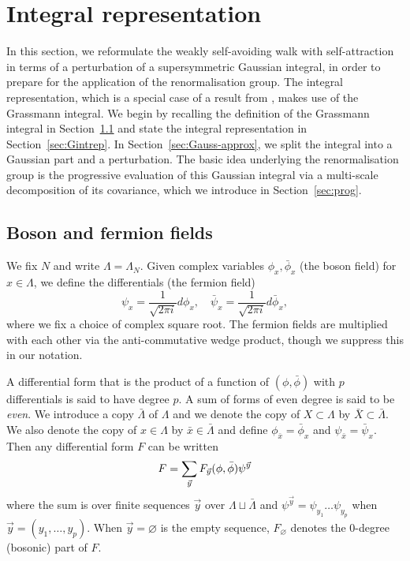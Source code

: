 \section{Integral representation}
In this section, we reformulate the %
weakly self-avoiding walk with self-attraction in terms of a perturbation of a supersymmetric
Gaussian integral, in order to prepare for the application of the renormalisation group.
The integral representation, which is a special case of a result from \cite{BIS09},
makes use of the Grassmann integral. We begin by recalling the definition of the Grassmann
integral in Section~\ref{sec:forms} and state the integral representation in Section~\ref{sec:Gintrep}.
In Section~\ref{sec:Gauss-approx}, we split the integral into a Gaussian part and a perturbation.
The basic idea underlying the renormalisation group is the progressive evaluation of this
Gaussian integral via a multi-scale decomposition of its covariance, which we introduce in Section~\ref{sec:prog}.


\subsection{Boson and fermion fields}
\label{sec:forms}

We fix $N$ and write $\Lambda = \Lambda_N$.
Given complex variables $\phi_x, \bar\phi_x$
(the boson field) for $x \in \Lambda$,
we define the differentials (the fermion field)
\begin{equation}
\psi_x = \frac{1}{\sqrt{2\pi i}} d\phi_x,
\quad
\bar\psi_x = \frac{1}{\sqrt{2\pi i}} d\bar\phi_x,
\end{equation}
where we fix a choice of complex square root.
The fermion fields are multiplied with each other
via the anti-commutative wedge product,
though we suppress this in our notation.

A differential form that is the
product of a function of $(\phi, \bar\phi)$
with $p$ differentials is said to have degree $p$.
A sum of forms of even degree is said to be \emph{even}.
We introduce a copy $\bar\Lambda$ of $\Lambda$
and we denote the copy of $X \subset \Lambda$ by $\bar X \subset \bar\Lambda$.
We also denote the copy of $x \in \Lambda$
by $\bar x \in \bar\Lambda$ and define $\phi_{\bar x} = \bar\phi_x$ and $\psi_{\bar x} = \bar\psi_x$.
Then any differential form $F$ can be written
\begin{equation}
\lbeq{FinNcal}
F
=
\sum_{\vec y}
F_{\vec y} (\phi, \bar\phi)
\psi^{\vec y}
\end{equation}
where the sum is over finite sequences $\vec y$ over $\Lambda\sqcup\bar\Lambda$
and $\psi^{\vec y} = \psi_{y_1} \ldots \psi_{y_p}$ when $\vec y = (y_1, \ldots, y_p)$.
When $\vec y = \varnothing$ is the empty sequence,
$F_\varnothing$ denotes the $0$-degree (bosonic) part of $F$.

